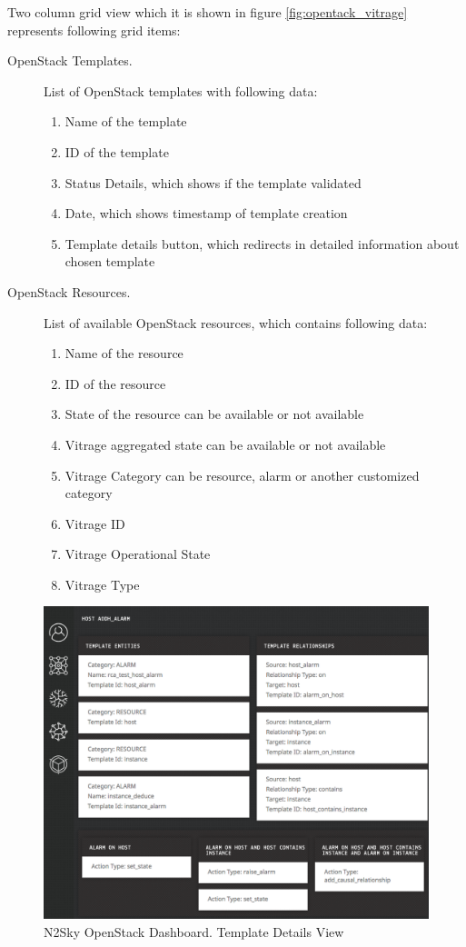 Two column grid view which it is shown in figure \ref{fig:opentack_vitrage} represents following grid items:

\begin{description}
\item[OpenStack Templates.]  List of OpenStack templates with following data:
\begin{enumerate}
\item Name of the template
\item ID of the template
\item Status Details, which shows if the template validated 
\item Date, which shows timestamp of template creation 
\item Template details button, which redirects in detailed information about chosen template
\end{enumerate}

\item[OpenStack Resources.] List of available OpenStack resources, which contains following data:
\begin{enumerate}
\item Name of the resource
\item ID of the resource
\item State of the resource can be available or not available
\item Vitrage aggregated state can be available or not available
\item Vitrage Category can be resource, alarm or another customized category
\item Vitrage ID
\item Vitrage Operational State
\item Vitrage Type
\end{enumerate}
\end{description}

\begin{figure}[htbp]
\begin{center}
  \includegraphics[width=\linewidth]{components/4/pics/openstack_template.png}
  \caption{N2Sky OpenStack Dashboard. Template Details View}
  \label{fig:openstack_template}
\end{center}
\end{figure}

